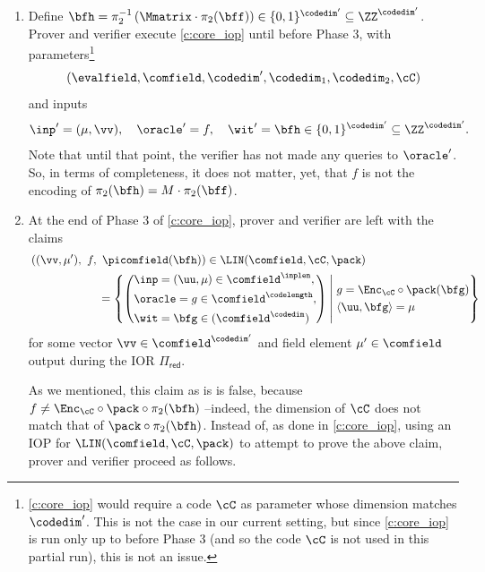 \begin{construction}
 \begin{enumerate}[leftmargin=*]
     \item Define  $\bfh = \pi_2^{-1}\left(\Mmatrix\cdot \pi_2(\bff)\right) \in \{0,1\}^{\codedim'} \subseteq \ZZ^{\codedim'}$. %
 Prover and verifier execute \cref{c:core_iop} until before Phase 3, with parameters\footnote{\cref{c:core_iop} would require a code $\cC$ as parameter whose dimension matches $\codedim'$. This is not the case in our current setting, but since \cref{c:core_iop} is run only up to before Phase 3 (and so the code $\cC$ is not used in this partial run), this is not an issue.}
     $$
     (\evalfield,\comfield, \codedim', \codedim_1, \codedim_2, \cC)
     $$ 
     and inputs 
    $$
    \inp' = (\mu, \vv),  \quad \oracle'=f,\quad  \wit' = \bfh \in \{0,1\}^{\codedim'} \subseteq \ZZ^{\codedim'}.
    $$
     Note that until that point, the verifier has not made any queries to $\oracle'$. So, in terms of completeness, it does not matter, yet, that $f$ is not the encoding of $\pi_2(\bfh)=M\cdot \pi_2(\bff)$.
 \item  At the end of Phase 3 of \cref{c:core_iop}, prover and verifier are left with the claims 
\begin{align*}\label{e:iopp_mle_claims_2}
&\left((\vv, \mu'), \ f, \ \picomfield(\bfh)\right) \in \LIN( \comfield,\cC,\pack) \\& \qquad\qquad\qquad = \left\{ \left(\begin{aligned} &\inp=(\uu,\mu)\in \comfield^\inplen, \\&\oracle = g \in \comfield^{\codelength}, \\ &\wit= \bfg\in (\comfield^\codedim)\end{aligned}\right) \;\middle|\;  \begin{aligned} 
&g=\Enc_{\cC}\circ \pack (\bfg) \\    &\langle \uu, \bfg\rangle = \mu  \end{aligned}\right\}
\end{align*} for some vector $\vv\in\comfield^{\codedim'}$  and field element $\mu'\in \comfield$ output during the IOR $\Pi_{\mathsf{red}}$. 

As we mentioned, this claim as is is false, because $f\neq \Enc_{\cC}\circ \pack\circ \pi_2(\bfh)$ --indeed, the dimension of $\cC$ does not match that of $\pack\circ \pi_2(\bfh)$. Instead of, as done in \cref{c:core_iop}, using an IOP for $\LIN( \comfield,\cC,\pack)$ to attempt to prove the above claim, prover and verifier proceed as follows.


\end{enumerate}
\end{construction}
